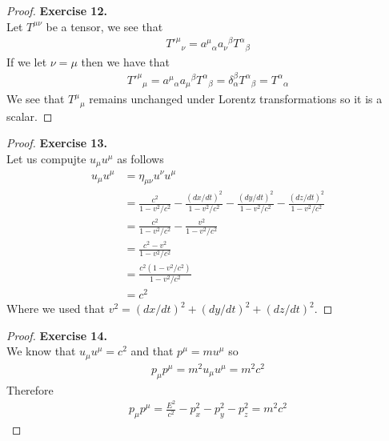 \documentclass[11pt]{article}
\theoremstyle{definition}
\begin{document}
\begin{proof}{\textbf{Exercise 12.}}\\
Let $T^{\mu\nu}$ be a tensor, we see that
\begin{align*}
    {T'^\mu}_\nu = {a^\mu}_\alpha {a_\nu}^\beta {T^\alpha}_\beta
\end{align*}
If we let $\nu = \mu$ then we have that
\begin{align*}
    {T'^\mu}_\mu
    = {a^\mu}_\alpha {a_\mu}^\beta {T^\alpha}_\beta
    = \delta_\alpha^\beta {T^\alpha}_\beta
    = {T^\alpha}_\alpha
\end{align*}
We see that ${T^\mu}_\mu$ remains unchanged under Lorentz transformations so
it is a scalar.
\end{proof}

\cleardoublepage
\begin{proof}{\textbf{Exercise 13.}}\\
Let us compujte $u_\mu u^\mu$ as follows
\begin{align*}
    u_\mu u^\mu &= \eta_{\mu\nu} u^\nu u^\mu\\
    &= \frac{c^2}{1 -v^2/c^2} - \frac{(dx/dt)^2}{1 - v^2/c^2}
    - \frac{(dy/dt)^2}{1 - v^2/c^2}
    - \frac{(dz/dt)^2}{1 - v^2/c^2} \\
    &= \frac{c^2}{1 -v^2/c^2} - \frac{v^2}{1 - v^2/c^2} \\
    &= \frac{c^2 - v^2}{1 -v^2/c^2} \\
    &= \frac{c^2(1 - v^2/c^2)}{1 -v^2/c^2} \\
    &= c^2
\end{align*}
Where we used that $v^2 = (dx/dt)^2 + (dy/dt)^2 + (dz/dt)^2$.
\end{proof}

\begin{proof}{\textbf{Exercise 14.}}\\
We know that $u_\mu u^\mu = c^2$ and that $p^\mu = m u^\mu$ so
\begin{align*}
    p_\mu p^\mu = m^2 u_\mu u^\mu = m^2 c^2
\end{align*}
Therefore
\begin{align*}
    p_\mu p^\mu = \frac{E^2}{c^2} - p_x^2 - p_y^2 - p_z^2 = m^2c^2
\end{align*}
\end{proof}
\end{document}
